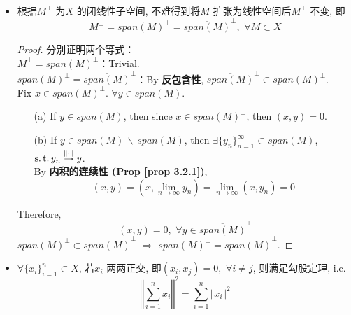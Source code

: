 \begin{defn}
\begin{rmk}
\begin{itemize}
				\newpage
				
				\item 根据$M^{\perp}$ 为$X$ 的闭线性子空间, 不难得到将$M$ 扩张为线性空间后$M^{\perp}$ 不变, 即
				\[ M^{\perp} = span(M)^{\perp} = \overline{span(M)}^{\perp} , \,\, \forall M \subset X \]
				
				\vspace{3em}
				
				\begin{proof}
					分别证明两个等式：\\
					$M^{\perp} = span(M)^{\perp}$：Trivial. \\
					$span(M)^{\perp} = \overline{span(M)}^{\perp}$：By \textbf{反包含性}, $\overline{span(M)}^{\perp} \subset span(M)^{\perp}$. \\
					Fix $x \in span(M)^{\perp}$. $\forall y \in \overline{span(M)}$. 
					\begin{enumerate}
						\item[(a)] If $y \in span(M)$, then since $x \in span(M)^{\perp}$, then $(x , y) = 0$. 
						
						\item[(b)] If $y \in \overline{span(M)} \, \backslash \, span(M)$, then $\exists \{ y_n \}_{n = 1}^{\infty} \subset span(M)$, $\operatorname{s.t.} y_n \overset{\Vert \cdot \Vert}{\to} y$. \\
						By \textbf{内积的连续性 (Prop \ref{prop 3.2.1})}, 
						\[ (x , y) 
						= \left( x , \lim_{n \to \infty} y_n \right) 
						= \lim_{n \to \infty} (x , y_n) 
						= 0 \]
					\end{enumerate}
					Therefore, 
					\[ (x , y) = 0 , \,\, \forall y \in \overline{span(M)}^{\perp} \]
					$span(M)^{\perp} \subset \overline{span(M)}^{\perp} \,\, \Rightarrow \,\, span(M)^{\perp} = \overline{span(M)}^{\perp}$.
				\end{proof}
				
				\vspace{8em}
				
				\item $\forall \{ x_i \}_{i = 1}^{n} \subset X$, 若$x_i$ 两两正交, 即$(x_i , x_j) = 0 , \,\, \forall i \neq j$, 则满足勾股定理, i.e.
				\[ \left\Vert \sum_{i = 1}^{n} x_i \right\Vert^2 = \sum_{i = 1}^n \Vert x_i \Vert^2 \]
				
				\vspace{3em}
				

\end{itemize}
\end{rmk}
\end{defn}
